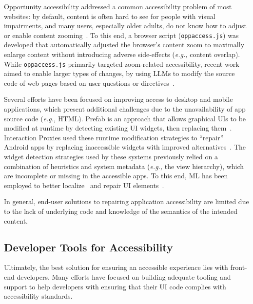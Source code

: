 \begin{highlight}
{Opportunity accessibility addressed a common accessibility problem of most websites: by default, content is often hard to see for people with visual impairments, and many users, especially older adults, do not know how to adjust or enable content zooming~\cite{bigham2014making}.
To this end, a browser script (\texttt{oppaccess.js}) was developed that automatically adjusted the browser's content zoom to maximally enlarge content without introducing adverse side-effects (\textit{e.g.,} content overlap).
While \texttt{oppaccess.js} primarily targeted zoom-related accessibility, recent work aimed to enable larger types of changes, by using LLMs to modify the source code of web pages based on user questions or directives~\cite{li2023using}.

Several efforts have been focused on improving access to desktop and mobile applications, which present additional challenges due to the unavailability of app source code (\textit{e.g.,} HTML).
Prefab is an approach that allows graphical UIs to be modified at runtime by detecting existing UI widgets, then replacing them~\cite{dixon2010prefab}.
Interaction Proxies used these runtime modification strategies to ``repair'' Android apps by replacing inaccessible widgets with improved alternatives~\cite{zhang2017interaction, zhang2018robust}.
The widget detection strategies used by these systems previously relied on a combination of heuristics and system metadata (\textit{e.g.,} the view hierarchy), which are incomplete or missing in the accessible apps.
To this end, ML has been employed to better localize~\cite{chen2020object} and repair UI elements~\cite{chen2020unblind,zhang2021screen,wu2023webui,peng2025dreamstruct}.

In general, end-user solutions to repairing application accessibility are limited due to the lack of underlying code and knowledge of the semantics of the intended content.

\subsection{Developer Tools for Accessibility}
Ultimately, the best solution for ensuring an accessible experience lies with front-end developers. Many efforts have focused on building adequate tooling and support to help developers with ensuring that their UI code complies with accessibility standards.

}
\end{highlight}
